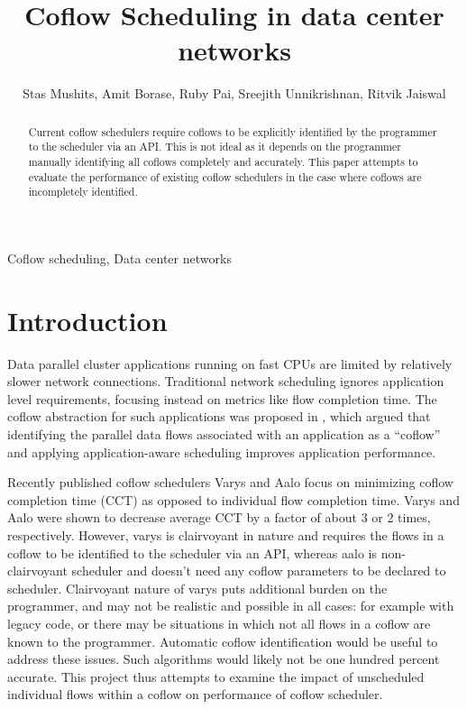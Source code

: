 \documentclass[conference]{IEEEtran}
\title{Coflow Scheduling in data center networks}
\begin{document}
\author{ Stas Mushits, Amit Borase, Ruby Pai, Sreejith Unnikrishnan, Ritvik Jaiswal }

\maketitle


\begin{abstract}
Current coflow schedulers require coflows to be explicitly identified by the programmer to the scheduler via an API. This is not ideal as it depends on the programmer manually identifying all coflows completely and accurately. This paper attempts to evaluate the performance of existing coflow schedulers in the case where coflows are incompletely identified.
\end{abstract}

\begin{IEEEkeywords}
Coflow scheduling, Data center networks
\end{IEEEkeywords}

\section{Introduction}

Data parallel cluster applications running on fast CPUs are limited by relatively slower network connections. Traditional network scheduling ignores application level requirements, focusing instead on metrics like flow completion time. The coflow abstraction for such applications was proposed in \cite{coflow}, which argued that identifying the parallel data flows associated with an application as a ``coflow'' and applying application-aware scheduling improves application performance.

Recently published coflow schedulers Varys \cite{varys} and Aalo \cite{aalo} focus on minimizing coflow completion time (CCT) as opposed to individual flow completion time. Varys and Aalo were shown to decrease average CCT by a factor of about 3 or 2 times, respectively. However, varys is clairvoyant in nature and requires the flows in a coflow to be identified to the scheduler via an API, whereas aalo is non-clairvoyant scheduler and doesn't need any coflow parameters to be declared to scheduler. Clairvoyant nature of varys puts additional burden on the programmer, and may not be realistic and possible in all cases: for example with legacy code, or there may be situations in which not all flows in a coflow are known to the programmer. Automatic coflow identification would be useful to address these issues. Such algorithms would likely not be one hundred percent accurate. This project thus attempts to examine the impact of unscheduled individual flows within a coflow on performance of coflow scheduler.
\end{document}
